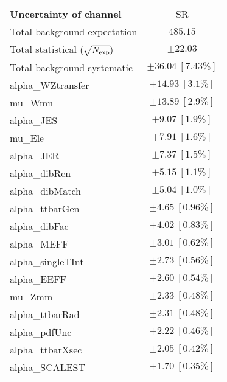 
\begin{table}
\begin{center}
\setlength{\tabcolsep}{0.0pc}
\begin{tabular*}{\textwidth}{@{\extracolsep{\fill}}lc}
\noalign{\smallskip}\hline\noalign{\smallskip}
{\bf Uncertainty of channel}                                    & SR            \\
\noalign{\smallskip}\hline\noalign{\smallskip}
Total background expectation             &  $485.15$       \\
\noalign{\smallskip}\hline\noalign{\smallskip}
Total statistical $(\sqrt{N_{\rm exp}})$              & $\pm 22.03$       \\
Total background systematic               & $\pm 36.04\ [7.43\%] $             \\
\noalign{\smallskip}\hline\noalign{\smallskip}
\noalign{\smallskip}\hline\noalign{\smallskip}
alpha\_WZtransfer         & $\pm 14.93\ [3.1\%] $       \\
mu\_Wmn         & $\pm 13.89\ [2.9\%] $       \\
alpha\_JES         & $\pm 9.07\ [1.9\%] $       \\
mu\_Ele         & $\pm 7.91\ [1.6\%] $       \\
alpha\_JER         & $\pm 7.37\ [1.5\%] $       \\
alpha\_dibRen         & $\pm 5.15\ [1.1\%] $       \\
alpha\_dibMatch         & $\pm 5.04\ [1.0\%] $       \\
alpha\_ttbarGen         & $\pm 4.65\ [0.96\%] $       \\
alpha\_dibFac         & $\pm 4.02\ [0.83\%] $       \\
alpha\_MEFF         & $\pm 3.01\ [0.62\%] $       \\
alpha\_singleTInt         & $\pm 2.73\ [0.56\%] $       \\
alpha\_EEFF         & $\pm 2.60\ [0.54\%] $       \\
mu\_Zmm         & $\pm 2.33\ [0.48\%] $       \\
alpha\_ttbarRad         & $\pm 2.31\ [0.48\%] $       \\
alpha\_pdfUnc         & $\pm 2.22\ [0.46\%] $       \\
alpha\_ttbarXsec         & $\pm 2.05\ [0.42\%] $       \\
alpha\_SCALEST         & $\pm 1.70\ [0.35\%] $       \\

\end{tabular*}
\end{center}
\end{table}
